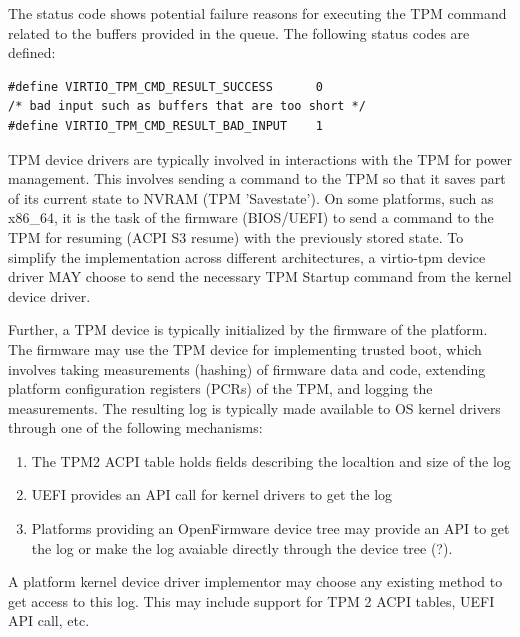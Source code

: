 The status code shows potential failure reasons for executing the TPM
command related to the buffers provided in the queue. The following status
codes are defined:

\begin{lstlisting}
#define VIRTIO_TPM_CMD_RESULT_SUCCESS      0
/* bad input such as buffers that are too short */
#define VIRTIO_TPM_CMD_RESULT_BAD_INPUT    1
\end{lstlisting}


TPM device drivers are typically involved in interactions with the TPM for
power management. This involves sending a command to the TPM so that it
saves part of its current state to NVRAM (TPM 'Savestate'). On some
platforms, such as x86_64, it is the task of the firmware (BIOS/UEFI) to send a
command to the TPM for resuming (ACPI S3 resume) with the previously stored
state. To simplify the implementation across different architectures, a
virtio-tpm device driver MAY choose to send the necessary TPM Startup command
from the kernel device driver.

Further, a TPM device is typically initialized by the firmware of the
platform. The firmware may use the TPM device for implementing trusted boot,
which involves taking measurements (hashing) of firmware data and code,
extending platform configuration registers (PCRs) of the TPM, and
logging the measurements. The resulting log is typically made available to
OS kernel drivers through one of the following mechanisms:

\begin{enumerate}
\item The TPM2 ACPI table holds fields describing the localtion and size of the log
\item UEFI provides an API call for kernel drivers to get the log
\item Platforms providing an OpenFirmware device tree may provide an API to get the
log or make the log avaiable directly through the device tree (?).
\end{enumerate}

A platform kernel device driver implementor may choose any existing method
to get access to this log. This may include support for TPM 2 ACPI tables,
UEFI API call, etc.

